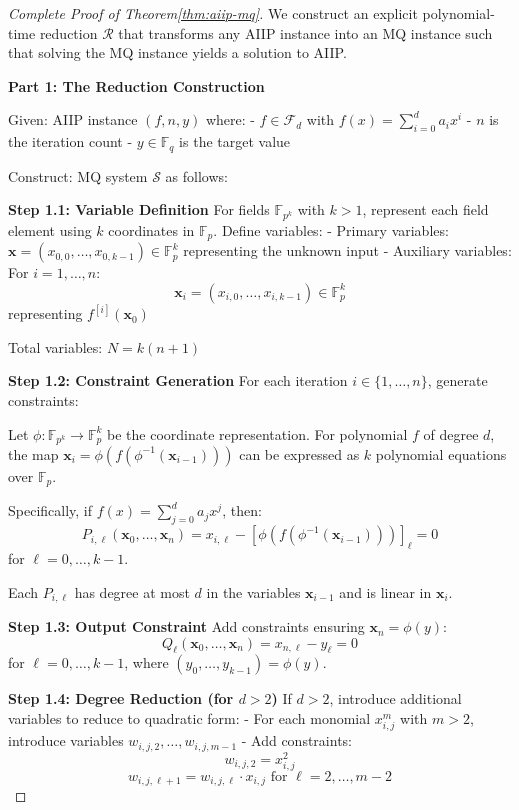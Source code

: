 \begin{proof}[Complete Proof of Theorem\ref{thm:aiip-mq}]
    We construct an explicit polynomial-time reduction $\mathcal{R}$ that transforms any AIIP instance into an MQ instance such that solving the MQ instance yields a solution to AIIP.

    \textbf{Part 1: The Reduction Construction}

        Given: AIIP instance $(f, n, y)$ where:
        - $f \in \mathcal{F}_d$ with $f(x) = \sum_{i=0}^d a_i x^i$
        - $n$ is the iteration count
        - $y \in \mathbb{F}_q$ is the target value

        Construct: MQ system $\mathcal{S}$ as follows:

        \textbf{Step 1.1: Variable Definition}
        For fields $\mathbb{F}_{p^k}$ with $k > 1$, represent each field element using $k$ 
        coordinates in $\mathbb{F}_p$. Define variables:
        - Primary variables: $\mathbf{x} = (x_{0,0}, \ldots, x_{0,k-1}) \in \mathbb{F}_p^k$ 
        representing the unknown input
        - Auxiliary variables: For $i = 1, \ldots, n$:
        $$\mathbf{x}_i = (x_{i,0}, \ldots, x_{i,k-1}) \in \mathbb{F}_p^k$$
        representing $f^{[i]}(\mathbf{x}_0)$

        Total variables: $N = k(n+1)$

        \textbf{Step 1.2: Constraint Generation}
        For each iteration $i \in \{1, \ldots, n\}$, generate constraints:

        Let $\phi: \mathbb{F}_{p^k} \to \mathbb{F}_p^k$ be the coordinate representation. For 
        polynomial $f$ of degree $d$, the map $\mathbf{x}_i = \phi(f(\phi^{-1}(\mathbf{x}_{i-1})))$ 
        can be expressed as $k$ polynomial equations over $\mathbb{F}_p$.

        Specifically, if $f(x) = \sum_{j=0}^d a_j x^j$, then:
        $$P_{i,\ell}(\mathbf{x}_0, \ldots, \mathbf{x}_n) = x_{i,\ell} - 
        [\phi(f(\phi^{-1}(\mathbf{x}_{i-1})))]_\ell = 0$$
        for $\ell = 0, \ldots, k-1$.

        Each $P_{i,\ell}$ has degree at most $d$ in the variables $\mathbf{x}_{i-1}$ and is 
        linear in $\mathbf{x}_i$.

        \textbf{Step 1.3: Output Constraint}
        Add constraints ensuring $\mathbf{x}_n = \phi(y)$:
        $$Q_\ell(\mathbf{x}_0, \ldots, \mathbf{x}_n) = x_{n,\ell} - y_\ell = 0$$
        for $\ell = 0, \ldots, k-1$, where $(y_0, \ldots, y_{k-1}) = \phi(y)$.

        \textbf{Step 1.4: Degree Reduction (for $d > 2$)}
        If $d > 2$, introduce additional variables to reduce to quadratic form:
        - For each monomial $x_{i,j}^m$ with $m > 2$, introduce variables 
        $w_{i,j,2}, \ldots, w_{i,j,m-1}$
        - Add constraints:
        $$w_{i,j,2} = x_{i,j}^2$$
        $$w_{i,j,\ell+1} = w_{i,j,\ell} \cdot x_{i,j} \text{ for } \ell = 2, \ldots, m-2$$
        

\end{proof}
